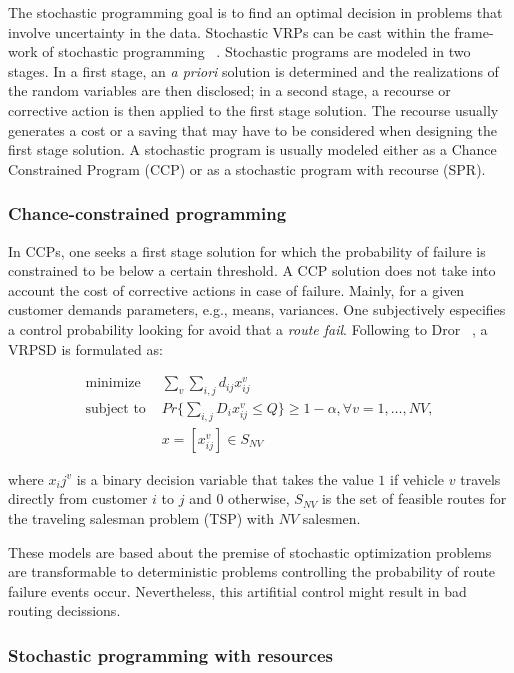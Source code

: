 The stochastic programming goal is to find an optimal decision in problems that involve uncertainty in the data. Stochastic VRPs can be cast within the frame-work of stochastic programming ~\cite{gendreau_stochastic_1996}. Stochastic programs are modeled in two stages. In a first stage, an \textit{a priori} solution is determined and the realizations of the random variables are then disclosed; in a second stage, a recourse or corrective action is then applied to the first stage solution. The recourse usually generates a cost or a saving that may have to be considered when designing the first stage solution. A stochastic program is usually modeled either as a Chance Constrained Program (CCP) or as a stochastic program with recourse (SPR). 

 
\subsubsection{Chance-constrained programming}

In CCPs, one seeks a first stage solution for which the probability of failure is constrained to be below a certain threshold. A CCP solution does not take into account the cost of corrective actions in case of failure. Mainly, for a given customer demands parameters, e.g., means, variances. One subjectively especifies a control probability looking for avoid that a \textit{route fail}. Following to Dror ~\cite{Dror_2005}, a VRPSD is formulated as:

\begin{align}\label{eq:CCP}
 \text{minimize } & \sum_v\sum_{i,j}d_{ij}x_{ij}^v\\
 \text{subject to } & Pr\{\sum_{i,j}D_ix_{ij}^v \leq Q\} \geq 1-\alpha, \forall v = 1,\ldots,NV,\\
  & x = [x_{ij}^v] \in S_{NV}
\end{align}

where $x_ij^v$ is a binary decision variable that takes the value $1$ if vehicle $v$ travels directly from customer $i$ to $j$ and $0$ otherwise, $S_{NV}$ is the set of feasible routes for the traveling salesman problem (TSP) with $NV$ salesmen.

These models are based about the premise of stochastic optimization problems are transformable to deterministic problems controlling the probability of route failure events occur. Nevertheless, this artifitial control might result in bad routing decissions.


\subsubsection{Stochastic programming with resources}

